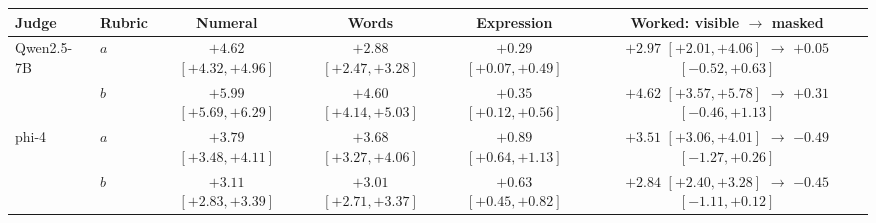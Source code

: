 \begin{tabular}{llcccc}
\toprule
Judge & Rubric & Numeral & Words & Expression & Worked: visible $\to$ masked \\
\midrule
Qwen2.5-7B & $a$ & $+4.62$ {\scriptsize$[+4.32,+4.96]$} & $+2.88$ {\scriptsize$[+2.47,+3.28]$} & $+0.29$ {\scriptsize$[+0.07,+0.49]$} & $+2.97$ {\scriptsize$[+2.01,+4.06]$} $\to$ $+0.05$ {\scriptsize$[-0.52,+0.63]$} \\
 & $b$ & $+5.99$ {\scriptsize$[+5.69,+6.29]$} & $+4.60$ {\scriptsize$[+4.14,+5.03]$} & $+0.35$ {\scriptsize$[+0.12,+0.56]$} & $+4.62$ {\scriptsize$[+3.57,+5.78]$} $\to$ $+0.31$ {\scriptsize$[-0.46,+1.13]$} \\
phi-4 & $a$ & $+3.79$ {\scriptsize$[+3.48,+4.11]$} & $+3.68$ {\scriptsize$[+3.27,+4.06]$} & $+0.89$ {\scriptsize$[+0.64,+1.13]$} & $+3.51$ {\scriptsize$[+3.06,+4.01]$} $\to$ $-0.49$ {\scriptsize$[-1.27,+0.26]$} \\
 & $b$ & $+3.11$ {\scriptsize$[+2.83,+3.39]$} & $+3.01$ {\scriptsize$[+2.71,+3.37]$} & $+0.63$ {\scriptsize$[+0.45,+0.82]$} & $+2.84$ {\scriptsize$[+2.40,+3.28]$} $\to$ $-0.45$ {\scriptsize$[-1.11,+0.12]$} \\
\bottomrule
\end{tabular}
